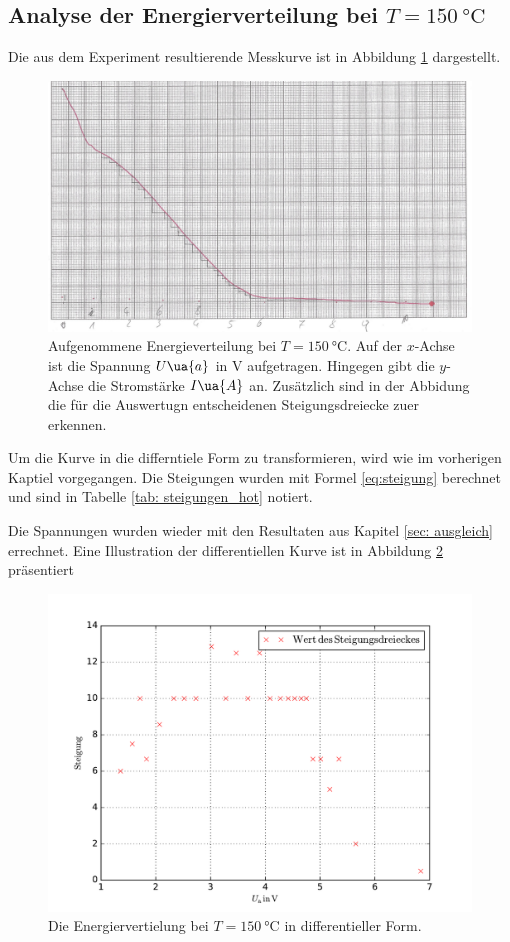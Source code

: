 \subsection{Analyse der Energierverteilung bei $T=\SI{150}{\celsius}$}
\FloatBarrier
Die aus dem Experiment resultierende Messkurve ist in Abbildung \ref{fig: messkurve_energie_hot} dargestellt.
\begin{figure}
  \centering
  \includegraphics[width=0.8 \textwidth]{./pics/energieverteilung_hot.png}
  \caption{Aufgenommene Energieverteilung bei $T=\SI{150}{\celsius}$. Auf der $x$-Achse ist die Spannung $U\ua{a}$ in $\si{\volt}$ aufgetragen.
          Hingegen gibt die $y$-Achse die Stromstärke $I\ua{A}$ an. Zusätzlich sind in der Abbidung die für die Auswertugn entscheidenen Steigungsdreiecke zuer erkennen.}
  \label{fig: messkurve_energie_hot}
\end{figure}
Um die Kurve in die differntiele Form zu transformieren, wird wie im vorherigen Kaptiel vorgegangen.
Die Steigungen wurden mit Formel \eqref{eq:steigung} berechnet und sind in Tabelle \ref{tab: steigungen_hot} notiert.

Die Spannungen wurden wieder mit den Resultaten aus Kapitel \ref{sec: ausgleich} errechnet.
Eine Illustration der differentiellen Kurve ist in Abbildung \ref{fig: energie_hot_diff} präsentiert
\begin{figure}
  \centering
  \includegraphics[width=0.9 \textwidth]{../Messdaten/energie_hot.pdf}
  \caption{Die Energiervertielung bei $T=\SI{150}{\celsius}$ in differentieller Form.}
  \label{fig: energie_hot_diff}
\end{figure}
